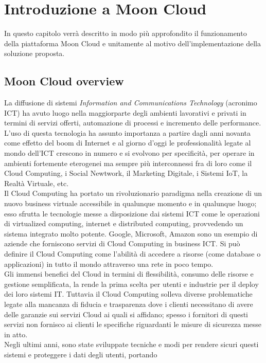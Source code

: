 \chapter{Introduzione a Moon Cloud}
\label{chp:01-introduction}
In questo capitolo verrà descritto in modo più approfondito il funzionamento della piattaforma Moon Cloud e unitamente al 
motivo dell'implementazione della soluzione proposta.

\section{Moon Cloud overview}
La diffusione di sistemi \textit{Information and Communications Technology} (acronimo ICT) ha avuto luogo nella maggiorparte degli ambienti 
lavorativi e privati in termini di servizi offerti, automazione di processi e incremento delle performance. L'uso di questa tecnologia 
ha assunto importanza a partire dagli anni novanta come effetto del boom di Internet e al giorno d'oggi le professionalità legate al
mondo dell'ICT crescono in numero e si evolvono per specificità, per operare in ambienti fortemente eterogenei ma sempre più 
interconnessi fra di loro come il Cloud Computing, i Social Newtwork, il Marketing Digitale, i Sistemi IoT, la Realtà Virtuale, etc.\\
Il Cloud Computing ha portato un rivoluzionario paradigma nella creazione di un nuovo business virtuale accessibile in qualunque momento
e in qualunque luogo; esso sfrutta le tecnologie messe a disposizione dai sistemi ICT come le operazioni di virtualized computing,
internet e distributed computing, provvedendo un sistema integrato molto potente. Google, Microsoft, Amazon sono un esempio di 
aziende che forniscono servizi di Cloud Computing in business ICT. Si può definire il Cloud Computing come l'abilità di accedere a 
risorse (come database o applicazioni) in tutto il mondo attraverso una rete in poco tempo.\\
Gli immensi benefici del Cloud in termini di flessibilità, consumo delle risorse e gestione semplificata, la rende la prima scelta per 
utenti e industrie per il deploy dei loro sistemi IT. Tuttavia il Cloud Computing solleva diverse problematiche legate alla mancanza di 
fiducia e trasparenza dove i clienti necessitano di avere delle garanzie sui servizi Cloud ai quali si affidano; spesso i fornitori di 
questi servizi non fornisco ai clienti le specifiche riguardanti le misure di sicurezza messe in atto.\\
Negli ultimi anni, sono state sviluppate tecniche e modi per rendere sicuri questi sistemi e proteggere i dati degli utenti, portando 
